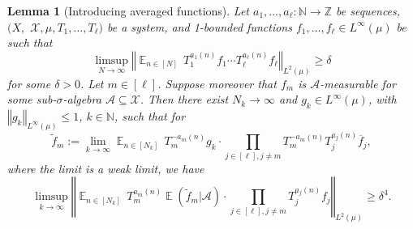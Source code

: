 \documentclass[11pt]{amsart}
\newtheorem{lemma}{Lemma}[section]
\theoremstyle{definition}
\newcommand{\N}{{\mathbb N}}
\newcommand{\Z}{{\mathbb Z}}
\newcommand{\CA}{{\mathcal A}}
\newcommand{\CX}{{\mathcal X}}
\newcommand{\norm}[1]{\left\Vert #1\right\Vert}
\DeclareMathOperator*{\E}{\mathbb{E}}
\begin{document}
\begin{lemma}[Introducing averaged functions]\label{P:dual}
	Let $a_1,\ldots, a_\ell\colon \N\to \Z$  be sequences, $(X,$ $\CX, \mu, T_1, \ldots, T_\ell)$ be a system, and 1-bounded functions $f_1,\ldots, f_\ell\in L^\infty(\mu)$ be such that
	\begin{equation*}%
	\limsup_{N\to\infty}\norm{\E_{n\in [N]} \, T_1^{a_1(n)}f_1\cdots T_\ell^{a_\ell(n)}f_\ell}_{L^2(\mu)} \geq \delta
	\end{equation*}
	for some $\delta>0$. Let $m\in [\ell]$. Suppose moreover that $f_m$ is $\CA$-measurable for some sub-$\sigma$-algebra $\CA\subseteq\CX$. Then  there exist $N_k\to\infty$ and $g_k\in L^\infty(\mu)$, with  $\norm{g_k}_{L^\infty(\mu)}\leq 1$,  $k\in\N$, such that for
	\begin{equation*}%
	\tilde{f}_m:=\lim_{k\to\infty} \E_{n\in [N_k]}
	 \, T_m^{-a_m(n)}g_k\cdot \prod_{j\in [\ell], j\neq m}T_m^{-a_m(n)} T_j^{a_j(n)}\overline{f}_j,
	\end{equation*}
	where the limit is a weak limit, we have
	\begin{equation*}%
	\limsup_{k\to\infty}\norm{\E_{n\in[N_k]} \, T_m^{a_m(n)}\E(\tilde{f}_m|\CA)\cdot  \prod_{j\in [\ell], j\neq m}T_j^{a_j(n)}f_j}_{L^2(\mu)} \geq \delta^4.
	\end{equation*}
\end{lemma}
\end{document}

